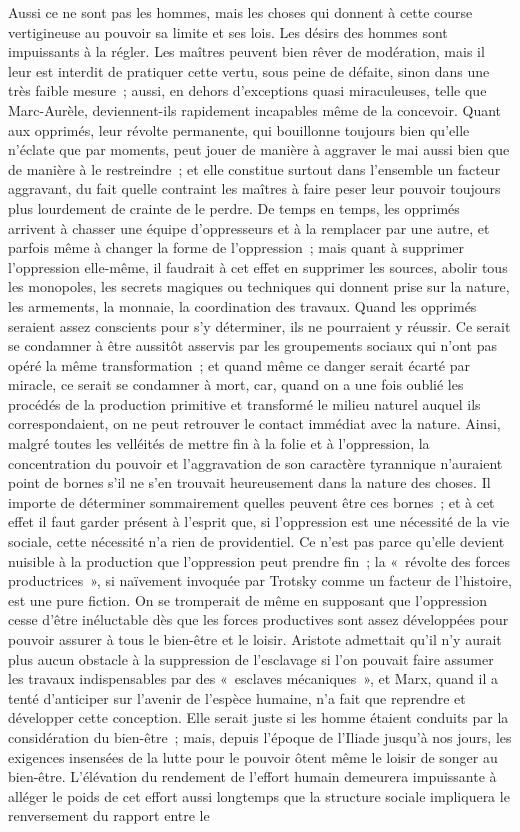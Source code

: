 \documentclass[french,twoside]{book} %
\begin{document}
Aussi ce ne sont pas les hommes, mais les choses qui donnent à cette course vertigineuse au pouvoir sa limite et ses lois. Les désirs des hommes sont impuissants à la régler. Les maîtres peuvent bien rêver de modération, mais il leur est interdit de pratiquer cette vertu, sous peine de défaite, sinon dans une très faible mesure ; aussi, en dehors d'exceptions quasi miraculeuses, telle que Marc-Aurèle, deviennent-ils rapidement incapables même de la concevoir. Quant aux opprimés, leur révolte permanente, qui bouillonne toujours bien qu'elle n'éclate que par moments, peut jouer de manière à aggraver le mai aussi bien que de manière à le restreindre ; et elle constitue surtout dans l'ensemble un facteur aggravant, du fait quelle contraint les maîtres à faire peser leur pouvoir toujours plus lourdement de crainte de le perdre. De temps en temps, les opprimés arrivent à chasser une équipe d'oppresseurs et à la remplacer par une autre, et parfois même à changer la forme de l'oppression ; mais quant à supprimer l'oppression elle-même, il faudrait à cet effet en supprimer les sources, abolir tous les monopoles, les secrets magiques ou techniques qui donnent prise sur la nature, les armements, la monnaie, la coordination des travaux. Quand les opprimés seraient assez conscients pour s'y déterminer, ils ne pourraient y réussir. Ce serait se condamner à être aussitôt asservis par les groupements sociaux qui n'ont pas opéré la même transformation ; et quand même ce danger serait écarté par miracle, ce serait se condamner à mort, car, quand on a une fois oublié les procédés de la production primitive et transformé le milieu naturel auquel ils correspondaient, on ne peut retrouver le contact immédiat avec la nature. Ainsi, malgré toutes les velléités de mettre fin à la folie et à l'oppression, la concentration du pouvoir et l'aggravation de son caractère tyrannique n'auraient point de bornes s'il ne s'en trouvait heureusement dans la nature des choses. Il importe de déterminer sommairement quelles peuvent être ces bornes ; et à cet effet il faut garder présent à l'esprit que, si l'oppression est une nécessité de la vie sociale, cette nécessité n'a rien de providentiel. Ce n'est pas parce qu'elle devient nuisible à la production que l'oppression peut prendre fin ; la « révolte des forces productrices », si naïvement invoquée par Trotsky comme un facteur de l'histoire, est une pure fiction. On se tromperait de même en supposant que l'oppression cesse d'être inéluctable dès que les forces productives sont assez développées pour pouvoir assurer à tous le bien-être et le loisir. Aristote admettait qu'il n'y aurait plus aucun obstacle à la suppression de l'esclavage si l'on pouvait faire assumer les travaux indispensables par des « esclaves mécaniques », et Marx, quand il a tenté d'anticiper sur l'avenir de l'espèce humaine, n'a fait que reprendre et développer cette conception. Elle serait juste si les homme étaient conduits par la considération du bien-être ; mais, depuis l'époque de l'Iliade jusqu'à nos jours, les exigences insensées de la lutte pour le pouvoir ôtent même le loisir de songer au bien-être. L'élévation du rendement de l'effort humain demeurera impuissante à alléger le poids de cet effort aussi longtemps que la structure sociale impliquera le renversement du rapport entre le 
\end{document}
